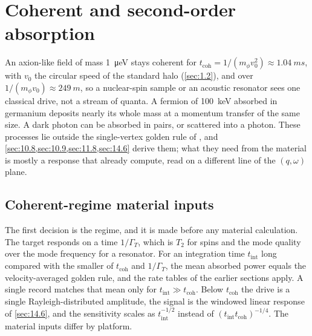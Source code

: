 \section{Coherent and second-order absorption}\label{app:E.26}

An axion-like field of mass \SI{1}{\micro eV} stays coherent for $t_{\mathrm{coh}} = 1/(m_\phi v_0^2) \approx \SI{1.04}{ms}$, with $v_0$ the circular speed of the standard halo (\cref{sec:1.2}), and over $1/(m_\phi v_0) \approx \SI{249}{m}$, so a nuclear-spin sample or an acoustic resonator sees one classical drive, not a stream of quanta. A fermion of \SI{100}{keV} absorbed in germanium deposits nearly its whole mass at a momentum transfer of the same size. A dark photon can be absorbed in pairs, or scattered into a photon. These processes lie outside the single-vertex golden rule of , and \cref{sec:10.8,sec:10.9,sec:11.8,sec:14.6} derive them; what they need from the material is mostly a response that  already compute, read on a different line of the $(q, \omega)$ plane.

\subsection{Coherent-regime material inputs}

The first decision is the regime, and it is made before any material calculation. The target responds on a time $1/\varGamma_T$, which is $T_2$ for spins and the mode quality over the mode frequency for a resonator. For an integration time $t_{\mathrm{int}}$ long compared with the smaller of $t_{\mathrm{coh}}$ and $1/\varGamma_T$, the mean absorbed power equals the velocity-averaged golden rule, and the rate tables of the earlier sections apply. A single record matches that mean only for $t_{\mathrm{int}} \gg t_{\mathrm{coh}}$. Below $t_{\mathrm{coh}}$ the drive is a single Rayleigh-distributed amplitude, the signal is the windowed linear response of \cref{sec:14.6}, and the sensitivity scales as $t_{\mathrm{int}}^{-1/2}$ instead of $(t_{\mathrm{int}}t_{\mathrm{coh}})^{-1/4}$. The material inputs differ by platform.

